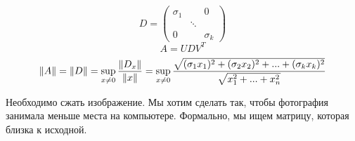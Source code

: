 \documentclass[main.tex]{subfiles}
\begin{document}
    \begin{Proof}
        \[D = \begin{pmatrix}
            \sigma_1 & & 0\\
                 &\ddots& \\
            0 & & \sigma_k
        \end{pmatrix}\]
        \[A = UDV^T\]
        \[\lVert A \rVert = \lVert D \rVert = \sup_{x \neq 0} \frac{\lVert D_x \rVert}{\lVert x \rVert} =
        \sup_{x \neq 0} \frac{\sqrt{(\sigma_1 x_1)^2 + (\sigma_2 x_2)^2 + ... +
    (\sigma_k x_k)^2}}{\sqrt{x_1^2 + ... + x_n^2}} \]
    \end{Proof}

    \begin{task}
        Необходимо сжать изображение. Мы хотим сделать так, чтобы
        фотография занимала меньше места на компьютере. Формально, мы ищем
        матрицу, которая близка к исходной.
    \end{task}
\end{document}
